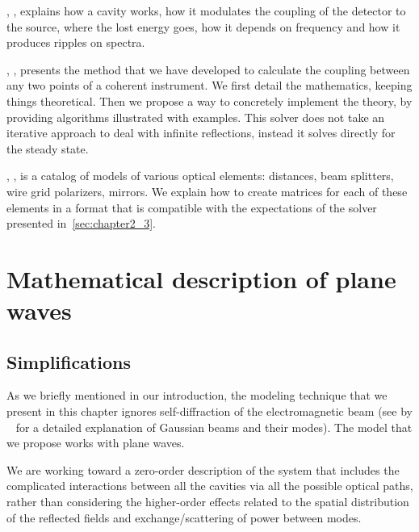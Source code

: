, \textit{}, explains how a cavity works, how it modulates the coupling of the detector to the source, where the lost energy goes, how it depends on frequency and how it produces ripples on spectra.

, \textit{}, presents the method that we have developed to calculate the coupling between any two points of a coherent instrument.
We first detail the mathematics, keeping things theoretical.
Then we propose a way to concretely implement the theory, by providing algorithms illustrated with examples.
This solver does not take an iterative approach to deal with infinite reflections, instead it solves directly for the steady state.

, \textit{}, is a catalog of models of various optical elements: distances, beam splitters, wire grid polarizers, mirrors.
We explain how to create matrices for each of these elements in a format that is compatible with the expectations of the solver presented in~\cref{sec:chapter2_3}.


\section{Mathematical description of plane waves}
\label{sec:chapter2_1}


\subsection{Simplifications}

As we briefly mentioned in our introduction, the modeling technique that we present in this chapter ignores self-diffraction of the electromagnetic beam
(see  by \citeauthor{goldsmith1998quasioptical}~\cite{goldsmith1998quasioptical} for a detailed explanation of Gaussian beams and their modes).
The model that we propose works with plane waves.

We are working toward a zero-order description of the system that includes the complicated interactions between all the cavities via all the possible optical paths, rather than considering the higher-order effects related to the spatial distribution of the reflected fields and exchange/scattering of power between modes.

